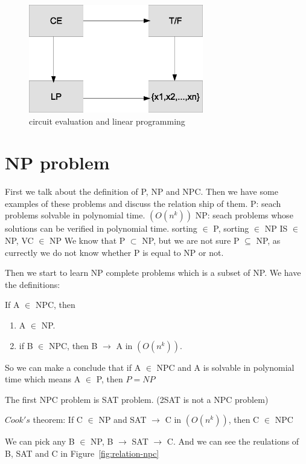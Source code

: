 \documentclass[usletter]{article}
\begin{document}
\begin{figure}[bht]
\begin{center}
     \includegraphics[width=3.0in]{figures/CE-LP}
\caption{\label{fig:CE-LP}circuit evaluation and linear programming}
\end{center}
\end{figure}

\section{NP problem}
First we talk about the definition of P, NP and NPC. Then we have some examples of these problems and discuss the relation ship of them.
P: seach problems solvable in polynomial time. $(O(n^k))$
NP: seach problems whose solutions can be verified in polynomial time.
sorting $\in$ P, sorting $\in$ NP
IS $\in$ NP, VC $\in$ NP
We know that P $\subset$ NP, but we are not sure P $\subseteq$ NP, as currectly we do not know whether P is equal to NP or not.

Then we start to learn NP complete problems which is a subset of NP. We have the definitions:

If A $\in$ NPC, then
\begin{enumerate}
	\item A $\in$ NP.
	\item if B $\in$ NPC, then B $\rightarrow$ A in $(O(n^k))$.
\end{enumerate}

So we can make a conclude that if A $\in$ NPC and A is solvable in polynomial time which means A $\in$ P, then $P=NP$

The first NPC problem is SAT problem. (2SAT is not a NPC problem)

\begin{theorem}
$Cook's$ theorem:
If C $\in$ NP and SAT $\rightarrow$ C in $(O(n^k))$, then C $\in$ NPC
\end{theorem}

We can pick any B $\in$ NP,  B $\rightarrow$ SAT $\rightarrow$ C. And we can see the reulations of B, SAT and C in Figure~\ref{fig:relation-npc}
\end{document}
